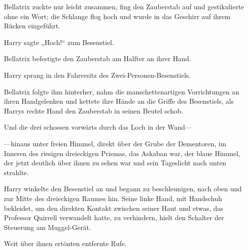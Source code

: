 Bellatrix zuckte nur leicht zusammen, fing den Zauberstab auf und gestikulierte ohne ein Wort; die Schlange flog hoch und wurde in das Geschirr auf ihrem Rücken eingeführt.

Harry sagte
„Hoch!“ zum Besenstiel.

Bellatrix befestigte den Zauberstab am Halfter an ihrer Hand.

Harry sprang in den Fahrersitz des Zwei-Personen-Besenstiels.

Bellatrix folgte ihm hinterher, nahm die manschettenartigen Vorrichtungen an ihren Handgelenken und kettete ihre Hände an die Griffe des Besenstiels, als Harrys rechte Hand den Zauberstab in seinen Beutel schob.

Und die drei schossen vorwärts durch das Loch in der Wand—

—hinaus unter freien Himmel, direkt über der Grube der Dementoren, im Inneren des riesigen dreieckigen Prismas, das Askaban war, der blaue Himmel, der jetzt deutlich über ihnen zu sehen war und sein Tageslicht nach unten strahlte.

Harry winkelte den Besenstiel an und begann zu beschleunigen, nach oben und zur Mitte des dreieckigen Raumes hin. Seine linke Hand, mit Handschuh bekleidet, um den direkten Kontakt zwischen seiner Haut und etwas, das Professor Quirrell verwandelt hatte, zu verhindern, hielt den Schalter der Steuerung am Muggel-Gerät.

Weit über ihnen ertönten entfernte Rufe.

